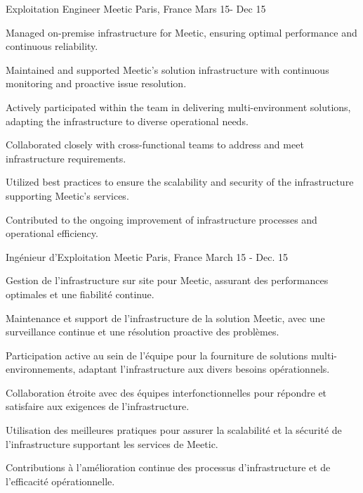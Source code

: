 \begin{cventries}
\cventry
{Exploitation Engineer} %
{Meetic} %
{Paris, France} %
{Mars 15- Dec 15} %
{
  \begin{cvitems} %
    \item {Managed on-premise infrastructure for Meetic, ensuring optimal performance and continuous reliability.}
    \item {Maintained and supported Meetic's solution infrastructure with continuous monitoring and proactive issue resolution.}
    \item {Actively participated within the team in delivering multi-environment solutions, adapting the infrastructure to diverse operational needs.}
    \item {Collaborated closely with cross-functional teams to address and meet infrastructure requirements.}
    \item {Utilized best practices to ensure the scalability and security of the infrastructure supporting Meetic's services.}
    \item {Contributed to the ongoing improvement of infrastructure processes and operational efficiency.}
  \end{cvitems}
}


\cventry
{Ingénieur d'Exploitation} %
{Meetic} %
{Paris, France} %
{March 15 - Dec. 15} %
{
  \begin{cvitems} %
    \item {Gestion de l'infrastructure sur site pour Meetic, assurant des performances optimales et une fiabilité continue.}
    \item {Maintenance et support de l'infrastructure de la solution Meetic, avec une surveillance continue et une résolution proactive des problèmes.}
    \item {Participation active au sein de l'équipe pour la fourniture de solutions multi-environnements, adaptant l'infrastructure aux divers besoins opérationnels.}
    \item {Collaboration étroite avec des équipes interfonctionnelles pour répondre et satisfaire aux exigences de l'infrastructure.}
    \item {Utilisation des meilleures pratiques pour assurer la scalabilité et la sécurité de l'infrastructure supportant les services de Meetic.}
    \item {Contributions à l'amélioration continue des processus d'infrastructure et de l'efficacité opérationnelle.}
  \end{cvitems}
}

\end{cventries}
